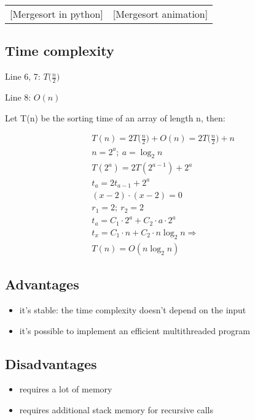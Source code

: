 \documentclass{article}
\begin{document}
		\begin{tabular}{cc}
			\begin{minipage}{0.5\textwidth}
				{pyMergeSort}[Mergesort in python]
			\end{minipage}
			&
			\begin{minipage}{0.5\textwidth}
				\myHref{https://giphy.com/gifs/algorithm-WLkahNhIBzxJu/fullscreen}[Mergesort animation]
			\end{minipage}
		\end{tabular}

		\subsection{Time complexity}
			Line 6, 7: \(T \Big( \frac{n}{2} \Big) \)
			\par Line 8: \(O(n)\)
			\par Let T(n) be the sorting time of an array of length n, then:

			\begin{equation*}
			\begin{split}
				& T(n) = 2T \Big( \frac{n}{2} \Big) + O(n) = 2T \Big( \frac{n}{2} \Big) + n \\
				& n = 2^a; \ a = \log_2 {n} \\
				& T(2^a) = 2T(2^{a - 1}) + 2^a \\
				& t_a = 2t_{a - 1} + 2^a \\
				& (x - 2) \cdot (x - 2) = 0 \\
				& r_1 = 2; \ r_2 = 2\\
				& t_a = C_1 \cdot 2^a + C_2 \cdot a \cdot 2^a\\
				& t_x = C_1 \cdot n + C_2 \cdot n\log_2 {n} \Rightarrow\\
				& T(n) = O(n\log_2 {n})
			\end{split}
			\end{equation*}

		\begin{minipage}[t]{0.45\textwidth}
			\subsection{Advantages}
			\begin{itemize}
					\item it's stable: the time complexity doesn't depend on the input
					\item it's possible to implement an efficient multithreaded program
			\end{itemize}
		\end{minipage}
		\begin{minipage}[t]{0.5\textwidth}
			\subsection{Disadvantages}
			\begin{itemize}
				\item requires a lot of memory
				\item requires additional stack memory for recursive calls
			\end{itemize}
		\end{minipage}
\end{document}
